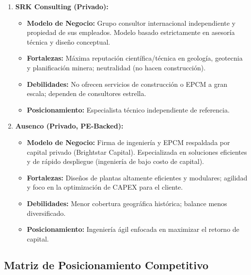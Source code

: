 \begin{enumerate}
    \item \textbf{SRK Consulting (Privado):}
    \begin{itemize}
        \item \textbf{Modelo de Negocio:} Grupo consultor internacional independiente y propiedad de sus empleados. Modelo basado estrictamente en asesoría técnica y diseño conceptual.
        \item \textbf{Fortalezas:} Máxima reputación científica/técnica en geología, geotecnia y planificación minera; neutralidad (no hacen construcción).
        \item \textbf{Debilidades:} No ofrecen servicios de construcción o EPCM a gran escala; dependen de consultores estrella.
        \item \textbf{Posicionamiento:} Especialista técnico independiente de referencia.
    \end{itemize}

    \item \textbf{Ausenco (Privado, PE-Backed):}
    \begin{itemize}
        \item \textbf{Modelo de Negocio:} Firma de ingeniería y EPCM respaldada por capital privado (Brightstar Capital). Especializada en soluciones eficientes y de rápido despliegue (ingeniería de bajo costo de capital).
        \item \textbf{Fortalezas:} Diseños de plantas altamente eficientes y modulares; agilidad y foco en la optimización de CAPEX para el cliente.
        \item \textbf{Debilidades:} Menor cobertura geográfica histórica; balance menos diversificado.
        \item \textbf{Posicionamiento:} Ingeniería ágil enfocada en maximizar el retorno de capital.
    \end{itemize}
\end{enumerate}

\subsection{Matriz de Posicionamiento Competitivo}

